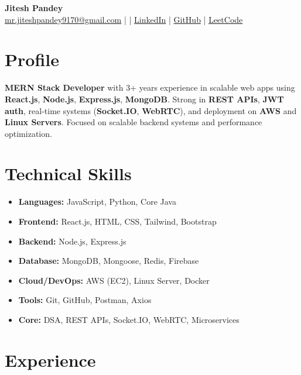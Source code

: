 \documentclass[letterpaper,11pt]{article}
\begin{document}
\begin{center}
    {\LARGE \textbf{Jitesh Pandey}} \\
    \href{mailto:mr.jiteshpandey9170@gmail.com}{mr.jiteshpandey9170@gmail.com} \quad |  \quad | \quad
    \href{https://www.linkedin.com/in/mr-jitesh9170/}{LinkedIn} \quad | \quad
    \href{https://github.com/Mr-Jitesh9170}{GitHub} \quad | \quad
    \href{https://leetcode.com/u/Mr-Jitesh9170/}{LeetCode}
\end{center}

\vspace{4pt}

\section{Profile}
\textbf{MERN Stack Developer} with 3+ years experience in scalable web apps using \textbf{React.js}, \textbf{Node.js}, \textbf{Express.js}, \textbf{MongoDB}. Strong in \textbf{REST APIs}, \textbf{JWT auth}, real-time systems (\textbf{Socket.IO}, \textbf{WebRTC}), and deployment on \textbf{AWS} and \textbf{Linux Servers}. Focused on scalable backend systems and performance optimization.

\section{Technical Skills}
\begin{itemize}
\item \textbf{Languages:} JavaScript, Python, Core Java
\item \textbf{Frontend:} React.js, HTML, CSS, Tailwind, Bootstrap
\item \textbf{Backend:} Node.js, Express.js
\item \textbf{Database:} MongoDB, Mongoose, Redis, Firebase
\item \textbf{Cloud/DevOps:} AWS (EC2), Linux Server, Docker
\item \textbf{Tools:} Git, GitHub, Postman, Axios
\item \textbf{Core:} DSA, REST APIs, Socket.IO, WebRTC, Microservices
\end{itemize}

\section{Experience}
\end{document}

